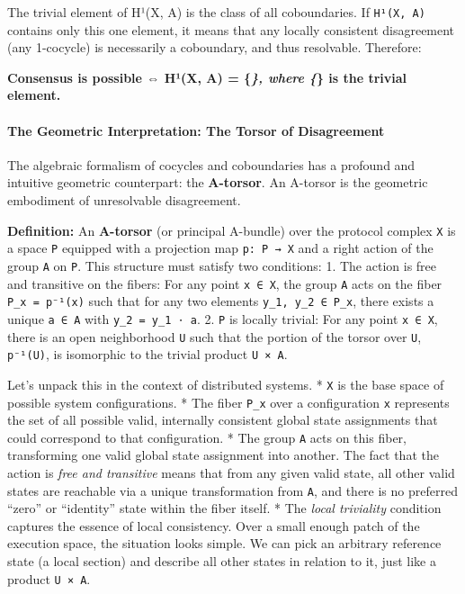 \documentclass[
]{article}
\begin{document}
The trivial element of H¹(X, A) is the class of all coboundaries. If
\texttt{H¹(X,\ A)} contains only this one element, it means that any
locally consistent disagreement (any 1-cocycle) is necessarily a
coboundary, and thus resolvable. Therefore:

\textbf{Consensus is possible ⇔ H¹(X, A) = \{\emph{\}, where \{}\} is
the trivial element.}

\paragraph{The Geometric Interpretation: The Torsor of
Disagreement}\label{the-geometric-interpretation-the-torsor-of-disagreement}

The algebraic formalism of cocycles and coboundaries has a profound and
intuitive geometric counterpart: the \textbf{A-torsor}. An A-torsor is
the geometric embodiment of unresolvable disagreement.

\textbf{Definition:} An \textbf{A-torsor} (or principal A-bundle) over
the protocol complex \texttt{X} is a space \texttt{P} equipped with a
projection map \texttt{p:\ P\ →\ X} and a right action of the group
\texttt{A} on \texttt{P}. This structure must satisfy two conditions: 1.
The action is free and transitive on the fibers: For any point
\texttt{x\ ∈\ X}, the group \texttt{A} acts on the fiber
\texttt{P\_x\ =\ p⁻¹(x)} such that for any two elements
\texttt{y\_1,\ y\_2\ ∈\ P\_x}, there exists a unique \texttt{a\ ∈\ A}
with \texttt{y\_2\ =\ y\_1\ ⋅\ a}. 2. \texttt{P} is locally trivial: For
any point \texttt{x\ ∈\ X}, there is an open neighborhood \texttt{U}
such that the portion of the torsor over \texttt{U}, \texttt{p⁻¹(U)}, is
isomorphic to the trivial product \texttt{U\ ×\ A}.

Let's unpack this in the context of distributed systems. * \texttt{X} is
the base space of possible system configurations. * The fiber
\texttt{P\_x} over a configuration \texttt{x} represents the set of all
possible valid, internally consistent global state assignments that
could correspond to that configuration. * The group \texttt{A} acts on
this fiber, transforming one valid global state assignment into another.
The fact that the action is \emph{free and transitive} means that from
any given valid state, all other valid states are reachable via a unique
transformation from \texttt{A}, and there is no preferred ``zero'' or
``identity'' state within the fiber itself. * The \emph{local
triviality} condition captures the essence of local consistency. Over a
small enough patch of the execution space, the situation looks simple.
We can pick an arbitrary reference state (a local section) and describe
all other states in relation to it, just like a product
\texttt{U\ ×\ A}.
\end{document}
